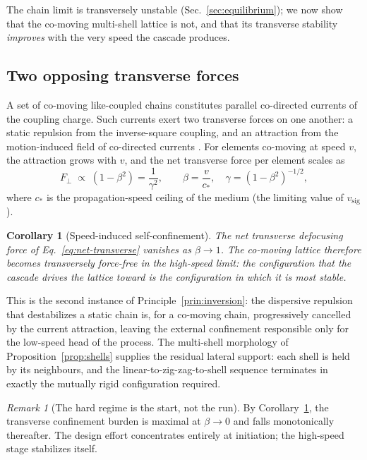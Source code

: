 \documentclass[twocolumn,10pt,a4paper]{article}
\theoremstyle{thmstyle}
\newtheorem{corollary}[theorem]{Corollary}
\theoremstyle{definition}
\theoremstyle{remark}
\newtheorem{remark}[theorem]{Remark}
\newcommand{\vsig}{v_{\mathrm{sig}}}
\begin{document}
The chain limit is transversely unstable (Sec.~\ref{sec:equilibrium}); we now
show that the co-moving multi-shell lattice is not, and that its transverse
stability \emph{improves} with the very speed the cascade produces.

\subsection{Two opposing transverse forces}

A set of co-moving like-coupled chains constitutes parallel co-directed
currents of the coupling charge. Such currents exert two transverse forces on
one another: a static repulsion from the inverse-square coupling, and an
attraction from the motion-induced field of co-directed currents
\citep{bennett1934}. For elements co-moving at speed $v$, the attraction
grows with $v$, and the net transverse force per element scales as
\begin{equation}
F_\perp \;\propto\; \left(1-\beta^2\right) = \frac{1}{\gamma^2},
\qquad \beta=\frac{v}{c_{\ast}},\quad \gamma=(1-\beta^2)^{-1/2},
\label{eq:net-transverse}
\end{equation}
where $c_{\ast}$ is the propagation-speed ceiling of the medium (the limiting
value of $\vsig$).

\begin{corollary}[Speed-induced self-confinement]
\label{cor:selfconfine}
The net transverse defocusing force of Eq.~\eqref{eq:net-transverse} vanishes
as $\beta\to1$. The co-moving lattice therefore becomes transversely
force-free in the high-speed limit: the configuration that the cascade drives
the lattice toward is the configuration in which it is most stable.
\end{corollary}

This is the second instance of Principle~\ref{prin:inversion}: the dispersive
repulsion that destabilizes a static chain is, for a co-moving chain,
progressively cancelled by the current attraction, leaving the external
confinement responsible only for the low-speed head of the process. The
multi-shell morphology of Proposition~\ref{prop:shells} supplies the residual
lateral support: each shell is held by its neighbours, and the
linear-to-zig-zag-to-shell sequence \citep{fishman2008} terminates in exactly
the mutually rigid configuration required.

\begin{remark}[The hard regime is the start, not the run]
By Corollary~\ref{cor:selfconfine}, the transverse confinement burden is
maximal at $\beta\to0$ and falls monotonically thereafter. The design effort
concentrates entirely at initiation; the high-speed stage stabilizes itself.
\end{remark}
\end{document}
